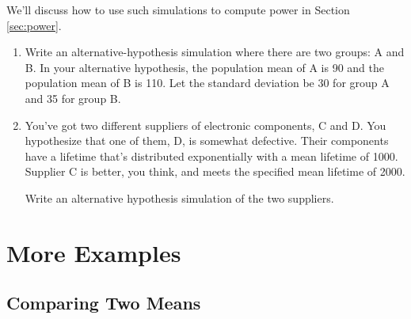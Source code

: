\begin{example}
\begin{knitrout}
\end{knitrout}

\end{example}

We'll discuss how to use such simulations to compute power in Section \ref{sec:power}.

\begin{problem}
\begin{enumerate}
\item   Write an alternative-hypothesis simulation where there are two groups: A and B.  In your
  alternative hypothesis, the population mean of A is 90 and the
  population mean of B is 110.  Let the standard deviation be 30 for
  group A and 35 for group B.  
 
\item You've got two different suppliers of electronic components, C
  and D.
  You hypothesize that one of them, D, is somewhat defective. Their
  components have a lifetime that's distributed exponentially with a
  mean lifetime of 1000.  Supplier C is better, you think, and meets
  the specified mean lifetime of 2000.  
  
  Write an alternative hypothesis simulation of the two suppliers.
\end{enumerate}  
\end{problem}

\section{More Examples}

\subsection{Comparing Two Means}

\label{sec:comparing-two-means}


